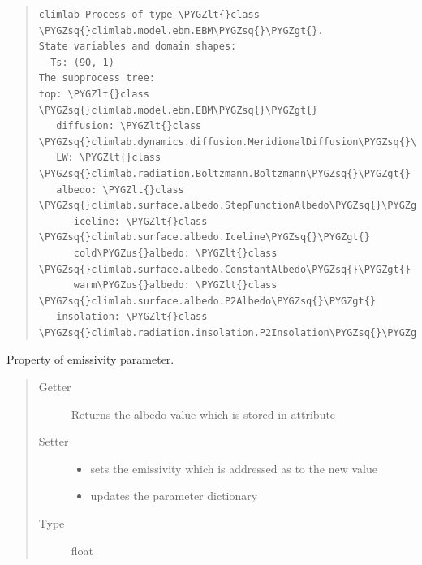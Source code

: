 \documentclass[a4paper,10pt,english]{sphinxmanual}
\def\PYGZus{\char`\_}
\def\PYGZlt{\char`\<}
\def\PYGZgt{\char`\>}
\def\PYGZsq{\char`\'}
\renewcommand\PYGZsq{\textquotesingle}
\begin{document}
\begin{fulllineitems}
\begin{quote}
\begin{description}
\begin{Verbatim}[commandchars=\\\{\}]
climlab Process of type \PYGZlt{}class \PYGZsq{}climlab.model.ebm.EBM\PYGZsq{}\PYGZgt{}. 
State variables and domain shapes: 
  Ts: (90, 1) 
The subprocess tree: 
top: \PYGZlt{}class \PYGZsq{}climlab.model.ebm.EBM\PYGZsq{}\PYGZgt{}
   diffusion: \PYGZlt{}class \PYGZsq{}climlab.dynamics.diffusion.MeridionalDiffusion\PYGZsq{}\PYGZgt{}
   LW: \PYGZlt{}class \PYGZsq{}climlab.radiation.Boltzmann.Boltzmann\PYGZsq{}\PYGZgt{}
   albedo: \PYGZlt{}class \PYGZsq{}climlab.surface.albedo.StepFunctionAlbedo\PYGZsq{}\PYGZgt{}
      iceline: \PYGZlt{}class \PYGZsq{}climlab.surface.albedo.Iceline\PYGZsq{}\PYGZgt{}
      cold\PYGZus{}albedo: \PYGZlt{}class \PYGZsq{}climlab.surface.albedo.ConstantAlbedo\PYGZsq{}\PYGZgt{}
      warm\PYGZus{}albedo: \PYGZlt{}class \PYGZsq{}climlab.surface.albedo.P2Albedo\PYGZsq{}\PYGZgt{}
   insolation: \PYGZlt{}class \PYGZsq{}climlab.radiation.insolation.P2Insolation\PYGZsq{}\PYGZgt{}
\end{Verbatim}

\end{description}\end{quote}

\begin{fulllineitems}
\label{api/climlab.radiation:climlab.radiation.Boltzmann.Boltzmann.eps}
Property of emissivity parameter.
\begin{quote}\begin{description}
\item[{Getter}] \leavevmode
Returns the albedo value which is stored in attribute 

\item[{Setter}] \leavevmode\begin{itemize}
\item {} 
sets the emissivity which is addressed as 
to the new value

\item {} 
updates the parameter dictionary 

\end{itemize}

\item[{Type}] \leavevmode
float

\end{description}\end{quote}


\end{fulllineitems}
\end{fulllineitems}
\end{document}
